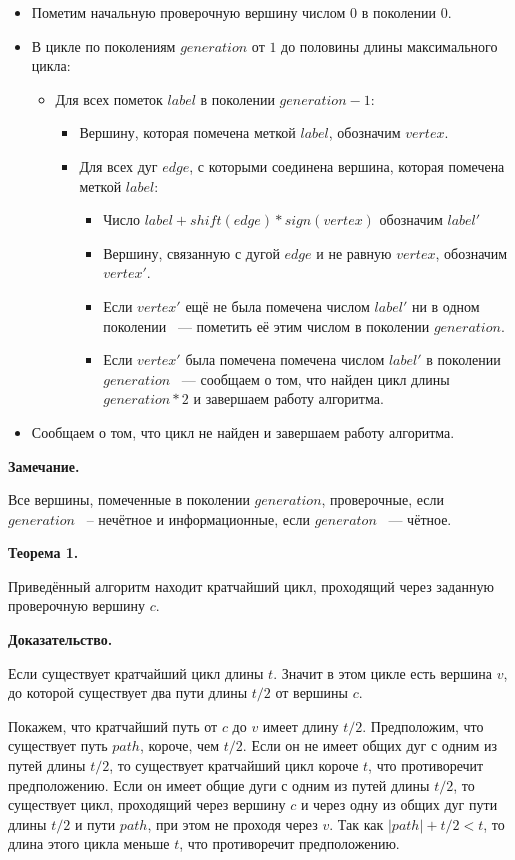 \documentclass[14pt]{mmcs-article}
\begin{document}
\begin{itemize}
\item Пометим начальную проверочную вершину числом $0$ в поколении $0$.
\item В цикле по поколениям $generation$ от $1$ до половины длины максимального цикла:
  \begin{itemize}
  \item Для всех пометок $label$ в поколении $generation - 1$:
    \begin{itemize}
    \item Вершину, которая помечена меткой $label$, обозначим $vertex$.
    \item Для всех дуг $edge$, с которыми соединена вершина, которая помечена меткой $label$:
      \begin{itemize}
      \item Число $label + shift(edge) * sign(vertex)$ обозначим $label'$
      \item Вершину, связанную с дугой $edge$ и не равную $vertex$, обозначим $vertex'$.
      \item Если $vertex'$ ещё не была помечена числом $label'$ ни в одном поколении ~--- пометить её этим числом в поколении $generation$.
      \item Если $vertex'$ была помечена помечена числом  $label'$ в поколении $generation$ ~--- сообщаем о том, что найден цикл длины $generation * 2$ и завершаем работу алгоритма.
      \end{itemize}
    \end{itemize}
  \end{itemize}
  \item Сообщаем о том, что цикл не найден и завершаем работу алгоритма.
\end{itemize}

\textbf{Замечание.}

Все вершины, помеченные в поколении $generation$, проверочные, если $generation$ ~-- нечётное и информационные, если $generaton$ ~--- чётное.

\textbf{Теорема 1.}

Приведённый алгоритм находит кратчайший цикл, проходящий через заданную проверочную вершину $c$.

\textbf{Доказательство.}

Если существует кратчайший цикл длины $t$. Значит в этом цикле есть вершина $v$, до которой существует два пути длины $t / 2$ от вершины $c$. 

Покажем, что кратчайший путь от $c$ до $v$ имеет длину $t / 2$.  Предположим, что существует путь $path$, короче, чем $t / 2$. Если он не имеет общих дуг с одним из путей длины $t / 2$, то существует кратчайший цикл короче $t$, что противоречит предположению. Если он имеет общие дуги с одним из путей длины $t / 2$, то существует цикл, проходящий через вершину $c$ и через одну из общих дуг пути длины $t / 2$ и пути $path$, при этом не проходя через $v$. Так как $|path| + t / 2 < t$, то длина этого цикла меньше $t$, что противоречит предположению.
\end{document}
